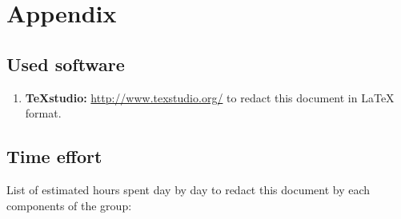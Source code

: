 \documentclass[english]{article}
\begin{document}
	
	\pagebreak
	
	\pagebreak
	
	\pagebreak
	
	\pagebreak
	
	\pagebreak
	\section{Appendix}
	
	\subsection{Used software}
	\begin{enumerate}
		\item \textbf{TeXstudio:} \url{http://www.texstudio.org/} to redact this document in {\LaTeX} format.
		
	\end{enumerate}
	
	\subsection{Time effort}
	List of estimated hours spent day by day to redact this document by each components of the group:
	\begin{center}
		\begin{adjustbox}{max width=\textwidth}	
			\begin{tabular}{|l|>{\raggedright}p{15cm}|}
      				\hline 		
      			\end{tabular}
		\end{adjustbox}
	\end{center}	
	
	
\end{document}

